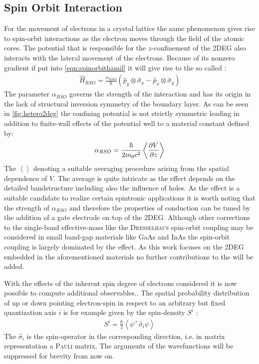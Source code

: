 \subsection{Spin Orbit Interaction}
For the movement of electrons in a crystal lattice the same phenomenon gives rise to spin-orbit interactions as the electron moves through the field of the atomic cores.
The potential that is responsible for the $z$-confinement of the 2DEG also interacts with the lateral movement of the electrons. Because of its nonzero gradient if put into \cref{eqn:spinorbithamil} it will give rise to the so called \rash{} \hamil{}:
\begin{align}
  \hat{H}_{RSO} =\frac{\alpha_{RSO}}{\hbar}(\hat{p}_{y} \otimes \hat{\sigma}_{x} - \hat{p}_{x} \otimes \hat{\sigma}_{y})
	\label{eqn:rashbahamiltonian}
\end{align}
The parameter $\alpha_{RSO}$ governs the strength of the interaction and has its origin in the lack of structural inversion symmetry of the boundary layer.
As can be seen in \cref{fig:hetero2deg} the confining potential is not strictly symmetric leading in addition to finite-wall effects of the potential well to a material constant defined by\cite{Metalidis2007Thesis}:
\begin{align}
\alpha_{RSO} = \frac{\hbar}{2m_0c^2} \left<\frac{\partial V}{\partial z} \right> 
\end{align}
The $\left< \right>$ denoting a suitable averaging procedure arising from the spatial dependence of $V$. The average is quite intricate as the effect depends on the detailed bandstructure including also the influence of holes\cite{JApplPhys.83.4324}.
As the \rash{} effect is a suitable candidate to realize certain spintronic applications it is worth noting that the strength of $\alpha_{RSO}$ and therefore the properties of conduction can be tuned by the addition of a gate electrode on top of the 2DEG\cite{PhysRevLett.78.1335}.
Although other corrections to the single-band effective-mass \hamil{} like the \textsc{Dresselhaus} spin-orbit coupling \cite{PhysRev.100.580} may be considered in small band-gap materials like GaAs and InAs the spin-orbit coupling is largely dominated by the \rash{} effect\cite{PhysRevB.61.15588}. As this work focuses on the 2DEG embedded in the aforementioned materials no further contributions to the \hamil{} will be added.\par
With the effects of the inherent spin degree of electrons considered it is now possible to compute additional observables..
The spatial probability distribution of up or down pointing electron-spin in respect to an arbitrary but fixed quantization axis $i$ is for example given by the spin-density $S^i$ \cite{JPhysA:MathGen.18.671}:
\begin{align}
S^i  = \frac{\hbar}{2} \left< \psi^+ \hat{\sigma}_i \psi \right>
\label{eqn:spindensity}
\end{align}
The $\hat{\sigma}_i$ is the spin-operator in the corresponding direction, i.e. in matrix representation a \textsc{Pauli} matrix. The arguments of the wavefunctions will be suppressed for brevity from now on.
